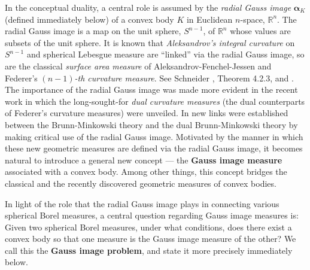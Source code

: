 \documentclass{cpamart1}     %
\theoremstyle{definition}
\theoremstyle{remark}
\newcommand{\rn}{\mathbb R^n}
\newcommand{\sn}{S^{n-1}}
\newcommand{\bsn}{\mathbf S^{n-1}}
\newcommand{\balpha}{\pmb{\alpha}}
\begin{document}
In the conceptual duality, a central role is assumed by the {\it radial Gauss image}
$\balpha_K$ (defined immediately below) of a convex body
$K$ in Euclidean $n$-space, $\rn$. The radial Gauss image is
a map on the unit sphere, $\sn$, of $\rn$ whose values are
subsets of the unit sphere.
It is known that {\it Aleksandrov's integral curvature} on $\sn$ and spherical Lebesgue measure
are ``linked'' via the radial Gauss image, so are the classical {\it surface area measure}
of Aleksandrov-Fenchel-Jessen and Federer's {\it $(n-1)$-th curvature measure}.
See Schneider \cite{S14}, Theorem 4.2.3, and
\cite{HLYZ16}.
The importance of the radial Gauss image was made more evident in the recent work \cite{HLYZ16}
in which the long-sought-for {\it dual curvature measures} (the dual counterparts of Federer's
curvature measures) were unveiled.
 In \cite{HLYZ16} new links were established between the Brunn-Minkowski
theory and the dual Brunn-Minkowski theory by making critical use of the radial Gauss image.
Motivated by the manner in which these new geometric measures are defined via
the radial Gauss image,
it becomes natural to introduce a general new concept ---
the {\bf Gauss image measure} associated with a convex body. Among other things, this
concept bridges the classical and the recently discovered geometric measures of convex bodies.


 In light of the role that the radial Gauss image plays in connecting various spherical Borel measures,
a central question regarding
Gauss image measures is: Given two spherical Borel measures,
under what conditions,
does there exist a convex body so that one measure
is the Gauss image measure of the other?
We call this the {\bf Gauss image problem}, and state it more precisely immediately below.



\end{document}
